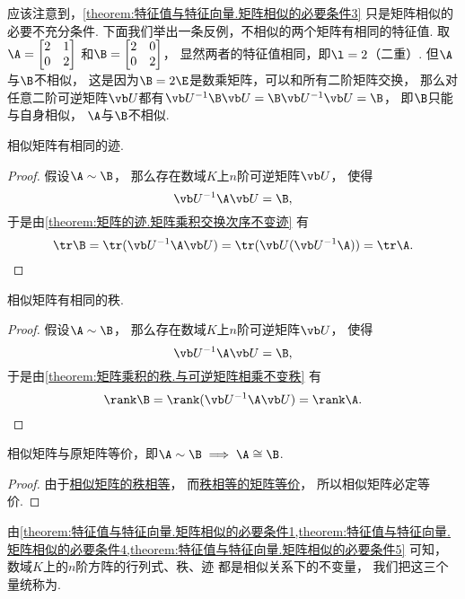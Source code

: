 应该注意到，\cref{theorem:特征值与特征向量.矩阵相似的必要条件3} 只是矩阵相似的必要不充分条件.
下面我们举出一条反例，不相似的两个矩阵有相同的特征值.
取\(\A=\begin{bmatrix} 2 & 1 \\ 0 & 2 \end{bmatrix}\)
和\(\B=\begin{bmatrix} 2 & 0 \\ 0 & 2 \end{bmatrix}\)，
显然两者的特征值相同，即\(\l=2\)（二重）.
但\(\A\)与\(\B\)不相似，
这是因为\(\B=2\E\)是数乘矩阵，可以和所有二阶矩阵交换，
那么对任意二阶可逆矩阵\(\P\)都有\(\P^{-1}\B\P=\B\P^{-1}\P=\B\)，
即\(\B\)只能与自身相似，
\(\A\)与\(\B\)不相似.

\begin{property}\label{theorem:特征值与特征向量.矩阵相似的必要条件4}
相似矩阵有相同的迹.
\begin{proof}
假设\(\A\sim\B\)，
那么存在数域\(K\)上\(n\)阶可逆矩阵\(\P\)，
使得\[
	\P^{-1}\A\P=\B,
\]
于是由\cref{theorem:矩阵的迹.矩阵乘积交换次序不变迹} 有\[
	\tr\B
	= \tr(\P^{-1}\A\P)
	= \tr(\P(\P^{-1}\A))
	= \tr\A.
	\qedhere
\]
\end{proof}
\end{property}

\begin{property}\label{theorem:特征值与特征向量.矩阵相似的必要条件5}
相似矩阵有相同的秩.
\begin{proof}
假设\(\A\sim\B\)，
那么存在数域\(K\)上\(n\)阶可逆矩阵\(\P\)，
使得\[
	\P^{-1}\A\P=\B,
\]
于是由\cref{theorem:矩阵乘积的秩.与可逆矩阵相乘不变秩} 有\[
	\rank\B = \rank(\P^{-1}\A\P)
	= \rank\A.
	\qedhere
\]
\end{proof}
\end{property}

\begin{property}
相似矩阵与原矩阵等价，即\(\A\sim\B \implies \A\cong\B\).
\begin{proof}
由于\hyperref[theorem:特征值与特征向量.矩阵相似的必要条件5]{相似矩阵的秩相等}，
而\hyperref[theorem:矩阵乘积的秩.矩阵等价的充分必要条件]{秩相等的矩阵等价}，
所以相似矩阵必定等价.
\end{proof}
\end{property}

\begin{remark}
由\cref{theorem:特征值与特征向量.矩阵相似的必要条件1,theorem:特征值与特征向量.矩阵相似的必要条件4,theorem:特征值与特征向量.矩阵相似的必要条件5} 可知，
数域\(K\)上的\(n\)阶方阵的行列式、秩、迹
都是相似关系下的不变量，
我们把这三个量统称为.
\end{remark}

